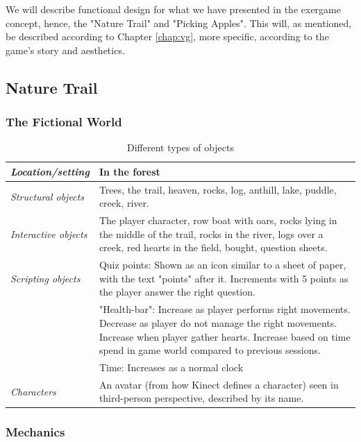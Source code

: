 We will describe functional design for what we have presented in the exergame concept, hence, the "Nature Trail" and "Picking Apples". This will, as mentioned, be described according to Chapter \ref{chap:vg}, more specific, according to the game's story and aesthetics.  

\subsection{Nature Trail}

\subsubsection{The Fictional World} 

\begin{table} [H]
\centering
\begin{tabular}{|p{}|p{}|}
\hline
\emph{Location/setting} & In the forest  \\ \hline
\emph{Structural objects} & Trees, the trail, heaven, rocks, log, anthill, lake, puddle, creek, river.  \\ \hline
\emph{Interactive objects} & The player character, row boat with oars, rocks lying in the middle of the trail, rocks in the river, logs over a creek, red hearts in the field, bought, question sheets. \\ \hline
\emph{Scripting objects} & Quiz points: Shown as an icon similar to a sheet of paper, with the text "points" after it. Increments with 5 points as the player answer the right question.\\ \hline
	     & "Health-bar": Increase as player performs right movements. Decrease as player do not manage the right movements. Increase when player gather hearts. Increase based on time spend in game world compared to previous sessions. 
	      \\ \hline
	       & Time: Increases as a normal clock \\ \hline
\emph{Characters} & An avatar (from how Kinect defines a character) seen in third-person perspective, described by its name. \\ \hline
    \end{tabular}
    \caption[Various objects in the "Nature Trail"]{Different types of objects}
    \label{tab:objects1}
\end{table}  

\subsubsection{Mechanics} 

